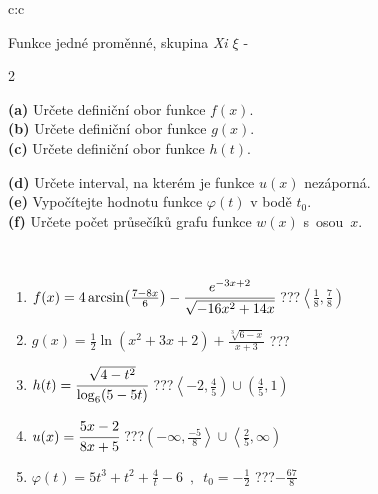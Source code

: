 \documentclass[10pt]{report}
\begin{document}
\begin{tabular}{c:c}
\begin{minipage}[c][104.5mm][t]{0.5\linewidth}
\begin{center}
\vspace{7mm}
{\huge Funkce jedné proměnné, skupina \textit{Xi $\xi$} -}\\[5mm]
\begin{minipage}{0.95\linewidth}
\begin{center}
{\small \begin{multicols}{2} \raggedright
\textbf{(a)} Určete definiční obor funkce \(f(x)\). \\[1mm]
\textbf{(b)} Určete definiční obor funkce \(g(x)\). \\[1mm]
\textbf{(c)} Určete definiční obor funkce \(h(t)\). \par \columnbreak
\textbf{(d)} Určete interval, na kterém je funkce \(u(x)\) nezáporná. \\[1mm]
\textbf{(e)} Vypočítejte hodnotu funkce \(\varphi(t)\) v bodě \(t_0\). \\[1mm]
\textbf{(f)} Určete počet průsečíků grafu funkce \(w(x)\) s~osou~\(x\). \\[1mm]
\end{multicols}
}
\end{center}
\end{minipage}
\\[4mm]
\begin{minipage}{0.79\linewidth}
\begin{center}
\begin{varwidth}{\linewidth}
\begin{enumerate}
\small
\item $f(x) = 4\arcsin\!\left( \frac{7-8x}{6} \right) - \cfrac{e^{-3x+2}}{\sqrt{-16x^2+14x}}$\quad \dotfill\; ???\;\dotfill \quad $\left\langle\frac{1}{8} , \frac{7}{8}\right)$
\item $g(x) = \frac{1}{2} \ln{\!(x^2+3x+2)}+\frac{\sqrt[3]{6-x}}{x+3}$\quad \dotfill\; ???\;\dotfill {}
\item $h(t) = \cfrac{\sqrt{4-t^2}}{\log_6(5-5t)}$\quad \dotfill\; ???\;\dotfill \quad $\left\langle-2 , \frac{4}{5}\right)\cup\left(\frac{4}{5} , 1\right)$
\item $u(x) = \cfrac{5x-2}{8x+5}$\quad \dotfill\; ???\;\dotfill \quad $\left(-\infty , \frac{-5}{8}\right\rangle\cup\left\langle\frac{2}{5} , \infty\right)$
\item $\varphi(t) = 5t^3+t^2+\frac{4}{t}-6 \enspace , \enspace t_0=-\frac{1}{2}$\quad \dotfill\; ???\;\dotfill \quad $-\frac{67}{8}$

\end{enumerate}
\end{varwidth}
\end{center}
\end{minipage}
\end{center}
\end{minipage}
\end{tabular}
\end{document}
